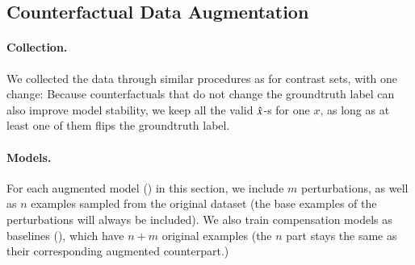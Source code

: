 \subsection{Counterfactual Data Augmentation}
\label{subsec:augmentation}
\paragraph{Collection.}
We collected the data through similar procedures as for contrast sets, with one change:
Because counterfactuals that do not change the groundtruth label can also improve model stability, we keep all the valid $\hat{x}$-s for one $x$, as long as at least one of them flips the groundtruth label.

\paragraph{Models.}

For each augmented model (\maug) in this section, we include $m$ perturbations, as well as $n$ examples sampled from the original dataset (the base examples of the perturbations will always be included).
We also train compensation models as baselines (\mcomp), which have $n+m$ original examples (the $n$ part stays the same as their corresponding augmented counterpart.)

